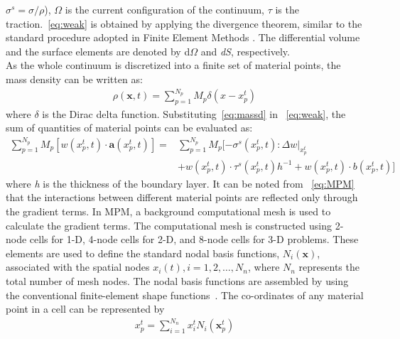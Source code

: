 $\sigma^{s} = \sigma / \rho$), $\Omega$ is the current configuration of the 
continuum, $\tau$ is the traction.~\cref{eq:weak} is obtained by applying 
the divergence theorem, similar to the standard procedure adopted in Finite 
Element Methods \citep{Sulsky1994,Sulsky1995, Chen2002}. The differential 
volume and the surface elements are denoted by d$\Omega$ and \textit{dS}, 
respectively. \\
As the whole continuum is discretized into a finite set of material points, the 
mass density can be written as:
\begin{align}
\rho(\mathbf{x},t)=\sum\limits_{\mathit{p}=1}^{\mathit{N}_{p}}{\mathit{M}_{p}\delta(\mathbf{\mathit{x}}-\mathbf{\mathit{x}}_{p}^{t})}
\label{eq:massd}
\end{align}
where $\delta$ is the Dirac delta function. Substituting~\cref{eq:massd} in 
~\cref{eq:weak}, the sum of quantities of material points can be evaluated 
as:
\begin{align}
\nonumber
\sum\limits_{\mathit{p}=1}^{\mathit{N}_{p}} 
\mathit{M}_{p}[\mathbf{\mathit{w}}(\mathit{x}_{p}^{t},t) \cdot 
\mathbf{a}(\mathit{x}_{p}^{t},t)] = & 
\sum\limits_{\mathit{p}=1}^{\mathit{N}_{p}} \mathit{M}_{p} 
[-\sigma^{s}(\mathit{x}_{p}^{t},t): \Delta 
\mathbf{\mathit{w}}|_{\mathit{x}_{p}^{t}} \\ 
& + \mathbf{\mathit{w}}(\mathit{x}_{p}^{t},t) \cdot 
\tau^{s}(\mathit{x}_{p}^{t},t)h^{-1} +  
\mathbf{\mathit{w}}(\mathit{x}_{p}^{t},t) \cdot 
\mathbf{\mathit{b}}(\mathit{x}_{p}^{t},t)]
\label{eq:MPM}
\end{align}
where \textit{h} is the thickness of the boundary layer. It can be noted from 
~\cref{eq:MPM} that the interactions between different material points are 
reflected only through the gradient terms. In MPM, a background computational 
mesh is used to calculate the gradient terms. The computational mesh is 
constructed using 2-node cells for 1-D, 4-node cells for 2-D, and 8-node cells 
for 3-D problems. These elements are used to define the standard nodal basis 
functions, $\mathit{N}_{i}(\mathbf{x})$, associated with the spatial nodes 
$\mathbf{\mathit{x}}_{i}(t), \mathit{i}=1,2,\dots,\mathit{N}_{n}$, where 
$\mathit{N}_{n}$ represents the total number of mesh nodes. The nodal basis 
functions are assembled by using the conventional finite-element shape 
functions~\citep{Chen2002}. The co-ordinates of any material point in a cell 
can be represented by
\begin{align}
\mathbf{\mathit{x}}_{p}^{t} = \sum\limits_{\mathit{i}=1}^{\mathit{N}_{n}} 
\mathbf{\mathit{x}}_{\mathit{i}}^{t}\mathit{N}_{\mathit{i}}(\mathbf{x}_{p}^{t})
\label{eq:x}
\end{align}
